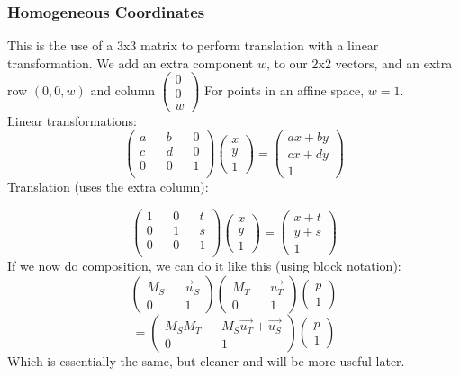 \documentclass[12pt]{article}
\theoremstyle{definition}
\begin{document}
\subsubsection{Homogeneous Coordinates}
This is the use of a 3x3 matrix to perform translation with a linear transformation. We add an extra component $w$, to our 2x2 vectors, and an extra row $(0, 0 ,w)$ and column $\begin{pmatrix} 0 \\ 0 \\ w\end{pmatrix}$
For points in an affine space, $w=1$. 
\\ \linebreak
Linear transformations:
$$\begin{pmatrix}
a && b && 0 \\
c && d && 0 \\
0 && 0 && 1 \\
\end{pmatrix}
\begin{pmatrix}
x \\ y \\ 1
\end{pmatrix} =
\begin{pmatrix}
ax + by \\
cx + dy \\
1
\end{pmatrix}$$
Translation (uses the extra column):

$$\begin{pmatrix}
	1 && 0 && t \\
	0 && 1 && s \\
	0 && 0 && 1 \\
\end{pmatrix}
\begin{pmatrix}
	x \\ y \\ 1
\end{pmatrix} =
\begin{pmatrix}
	x + t \\
	y + s \\
	1
\end{pmatrix}$$
If we now do composition, we can do it like this (using block notation):
$$
\begin{pmatrix}
M_S && \vec{u}_S \\
0 && 1
\end{pmatrix}
\begin{pmatrix}
M_T && \vec{u_T} \\
0 && 1
\end{pmatrix}
\begin{pmatrix}
p \\ 1
\end{pmatrix}$$
$$
= \begin{pmatrix}
M_SM_T && M_S\vec{u_T} + \vec{u_S} \\
0 && 1
\end{pmatrix}
\begin{pmatrix}
p \\
1
\end{pmatrix}
$$
Which is essentially the same, but cleaner and will be more useful later.
\end{document}
